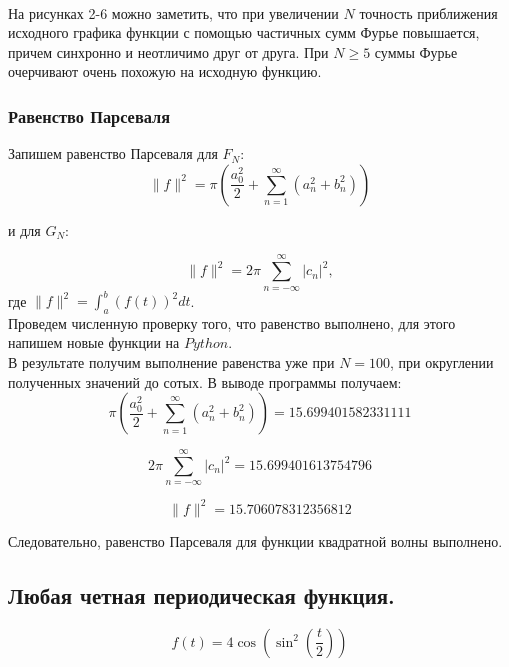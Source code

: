 \documentclass[a5paper, 10pt]{article}
\theoremstyle{definition}
\theoremstyle{plain}
\theoremstyle{remark}
\begin{document}
\newpage
\,
\newpage

На рисунках 2-6 можно заметить, что при увеличении $N$ точность приближения исходного графика функции с помощью частичных сумм Фурье повышается, причем синхронно и неотличимо друг от друга. При $N \geq 5$ суммы Фурье очерчивают очень похожую на исходную функцию.

\subsubsection{Равенство Парсеваля}

Запишем равенство Парсеваля для $F_N$:
\begin{equation}
\| f \|^2 = \pi \left( \frac{a_0^2}{2} + \sum \limits_{n=1}^{\infty} \left( a_n^2 + b_n^2 \right) \right)
\end{equation}

и для $G_N$:

\begin{equation}
\| f \|^2 = 2 \pi \sum \limits_{n = -\infty}^{\infty} |c_n |^2,
\end{equation}
где $\| f \|^2 = \int_a^b (f(t))^2 dt $.
\\
Проведем численную проверку того, что равенство выполнено, для этого напишем новые функции на $Python$. \\
В результате получим выполнение равенства уже при $N=100$, при округлении полученных значений до сотых. В выводе программы получаем:
\begin{equation*}
 \pi \left( \frac{a_0^2}{2} + \sum \limits_{n=1}^{\infty} \left( a_n^2 + b_n^2 \right) \right) = 15.699401582331111
\end{equation*}

\begin{equation*}
2 \pi \sum \limits_{n = -\infty}^{\infty} |c_n |^2 = 15.699401613754796
\end{equation*}

\begin{equation*}
\| f \|^2  = 15.706078312356812
\end{equation*}

Следовательно, равенство Парсеваля для функции квадратной волны выполнено.






\newpage
\subsection{Любая четная периодическая функция.}
\begin{equation}
f(t) = 4 \cos \left( \sin^2 \left( \frac{t}{2}\right) \right)
\end{equation}
\end{document}
